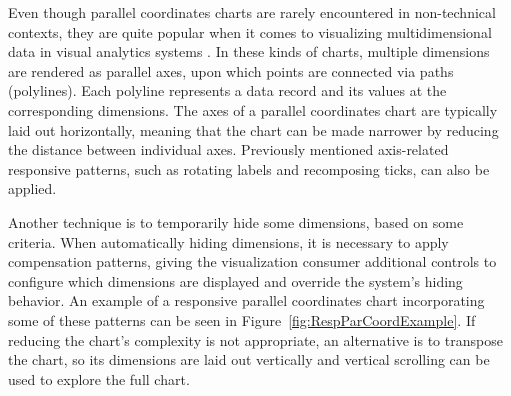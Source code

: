 Even though parallel coordinates charts
\parencite{ParallelCoordinates} are rarely encountered in
non-technical contexts, they are quite popular when it comes to
visualizing multidimensional data in visual analytics systems
\parencite{HighD}. In these kinds of charts, multiple dimensions are
rendered as parallel axes, upon which points are connected via paths
(polylines). Each polyline represents a data record and its values at
the corresponding dimensions. The axes of a parallel coordinates chart
are typically laid out horizontally, meaning that the chart can be
made narrower by reducing the distance between individual axes.
Previously mentioned axis-related responsive patterns, such as
rotating labels and recomposing ticks, can also be applied.

Another technique is to temporarily hide some dimensions, based on
some criteria. When automatically hiding dimensions, it is necessary
to apply compensation patterns, giving the visualization consumer
additional controls to configure which dimensions are displayed and
override the system's hiding behavior. An example of a responsive
parallel coordinates chart incorporating some of these patterns can be
seen in Figure~\ref{fig:RespParCoordExample}.
%
If reducing the chart's complexity is not appropriate, an alternative
is to transpose the chart, so its dimensions are laid out vertically
and vertical scrolling can be used to explore the full chart.




